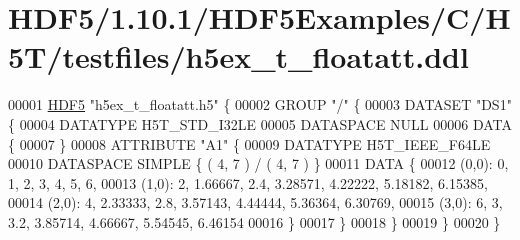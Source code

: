 \hypertarget{_h_d_f5_21_810_81_2_h_d_f5_examples_2_c_2_h5_t_2testfiles_2h5ex__t__floatatt_8ddl_source}{}\section{H\+D\+F5/1.10.1/\+H\+D\+F5\+Examples/\+C/\+H5\+T/testfiles/h5ex\+\_\+t\+\_\+floatatt.ddl}
\label{_h_d_f5_21_810_81_2_h_d_f5_examples_2_c_2_h5_t_2testfiles_2h5ex__t__floatatt_8ddl_source}

\begin{DoxyCode}
00001 \hyperlink{namespace_h_d_f5}{HDF5} \textcolor{stringliteral}{"h5ex\_t\_floatatt.h5"} \{
00002 GROUP \textcolor{stringliteral}{"/"} \{
00003    DATASET \textcolor{stringliteral}{"DS1"} \{
00004       DATATYPE  H5T\_STD\_I32LE
00005       DATASPACE  NULL
00006       DATA \{
00007       \}
00008       ATTRIBUTE \textcolor{stringliteral}{"A1"} \{
00009          DATATYPE  H5T\_IEEE\_F64LE
00010          DATASPACE  SIMPLE \{ ( 4, 7 ) / ( 4, 7 ) \}
00011          DATA \{
00012          (0,0): 0, 1, 2, 3, 4, 5, 6,
00013          (1,0): 2, 1.66667, 2.4, 3.28571, 4.22222, 5.18182, 6.15385,
00014          (2,0): 4, 2.33333, 2.8, 3.57143, 4.44444, 5.36364, 6.30769,
00015          (3,0): 6, 3, 3.2, 3.85714, 4.66667, 5.54545, 6.46154
00016          \}
00017       \}
00018    \}
00019 \}
00020 \}
\end{DoxyCode}
